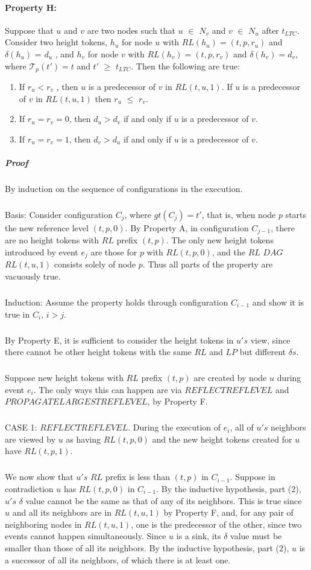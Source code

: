 \paragraph{Property H:} Suppose that $u$ and $v$ are two nodes such that $u$ $\in$ $N_v$ and $v$ $\in$ $N_u$ after $t_{LTC}$. Consider two height tokens, $h_u$ for node $u$ with $RL(h_u ) = (t, p, r_u )$ and $\delta (h_u )$ = $d_u$ , and $h_v$ for node $v$ with $RL(h_v ) = (t, p, r_v )$ and $\delta (h_v ) = d_v$, where $\mathcal{T}_p(t') = t$ and $t '$ $\geq$ $t_{LTC}$. Then the following are true: 
\begin{enumerate}
	\item If $r_u < r_v$ , then $u$ is a predecessor of $v$ in $RL (t, u, 1)$. If $u$ is a predecessor of $v$ in $RL (t, u, 1)$ then $r_u$ $\leq$ $r_v$.
	\item If $r_u = r_v = 0$, then $d_u > d_v$ if and only if $u$ is a predecessor of $v$.
	\item If $r_u = r_v = 1$, then $d_v > d_u$ if and only if $u$ is a predecessor of $v$.
\end{enumerate}
\subparagraph{Proof} By induction on the sequence of configurations in the execution. 
\subparagraph{}Basis: Consider configuration $C_j$, where $gt(C_j ) = t '$, that is, when node $p$ starts the new reference level $(t, p, 0)$. By Property A, in configuration $C_{j-1}$, there are no height tokens with $RL$ prefix $(t, p)$. The only new height tokens introduced by event $e_j$ are those for $p$ with $RL (t, p, 0)$, and the $RL$ $DAG$ $RL (t, u, 1)$ consists solely of node $p$. Thus all parts of the property are vacuously true.
\subparagraph{}Induction: Assume the property holds through configuration $C_{i-1}$ and show it is true in $C_i$, $i > j$.
\subparagraph{}By Property E, it is sufficient to consider the height tokens in $u's$ view, since there cannot be other height tokens with the same $RL$ and $LP$ but different $\delta s$.
\subparagraph{}Suppose new height tokens with $RL$ prefix $(t, p)$ are created by node $u$ during event $e_i$. The only ways this can happen are via $REFLECTREFLEVEL$ and $PROPAGATELARGESTREFLEVEL$, by Property F.
\subparagraph{}CASE 1: $REFLECTREFLEVEL$. During the execution of $e_i$, all of $u's$ neighbors are viewed by $u$ as having $RL (t, p, 0)$ and the new height tokens created for $u$ have $RL (t, p, 1)$.
\subparagraph{}We now show that $u's$ $RL$ prefix is less than $(t, p)$ in $C_{i-1}$. Suppose in contradiction $u$ has $RL (t, p, 0)$ in $C_{i-1}$. By the inductive hypothesis, part (2), $u's$ $\delta$ value cannot be the same as that of any of its neighbors. This is true since $u$ and all its neighbors are in $RL (t, u, 1)$ by Property F, and, for any pair of neighboring nodes in $RL (t, u, 1)$, one is the predecessor of the other, since two events cannot happen simultaneously. Since $u$ is a sink, its $\delta$ value must be smaller than those of all its neighbors. By the inductive hypothesis, part (2), $u$ is a successor of all its neighbors, of which there is at least one.
